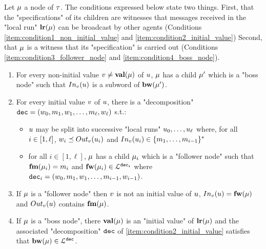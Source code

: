 Let $\mu$ a node of $\tau$. 
The conditions expressed below state two things. First, that the "specifications" of its children are witnesses that messages received in the "local run" $\mathbf{lr}(\mu)$ can be broadcast by other agents (Conditions \ref{item:condition1_non_initial_value} and \ref{item:condition2_initial_value})
Second, that $\mu$ is a witness that its "specification" is carried out (Conditions \ref{item:condition3_follower_node} and \ref{item:condition4_boss_node}).
\begin{enumerate}[{Condition} (i)]
	\item \label{item:condition1_non_initial_value} For every non-initial value $v \ne \mathbf{val}(\mu)$ of $u$, $\mu$ has a child $\mu'$ which is a "boss node" such that $\vinput{\aval}{\localrun}$ is a subword of $\mathbf{bw}(\mu')$.
	
	\item \label{item:condition2_initial_value} For every initial value $v$ of $u$, there is a "decomposition" $\mathtt{dec} = (w_0, m_1, w_1, \ldots, m_{\ell}, w_{\ell})$ s.t.:
	\begin{itemize}
		\item $u$ may be split into successive "local runs" $u_0, \dots, u_{\ell}$ where, for all $i \in [1,\ell]$, $w_i \subword \voutput{\aval}{\localrun_i}$ and $\vinput{\aval}{\localrun_i} \in \set{m_1, \dots, m_{i-1}}^*$
		\item for all $i \in [1,\ell]$, $\mu$ has a child $\mu_i$ which is a "follower node" such that $\mathbf{fm}(\mu_i) = m_i$ and $\mathbf{fw}(\mu_i) \in\mathcal{L}^{\mathtt{\mathtt{dec}_i}}$ where $\mathtt{dec}_i = (w_0, m_1, w_1, \ldots, m_{i-1}, w_{i-1})$.	\end{itemize}
	
	\item \label{item:condition3_follower_node} If $\mu$ is a "follower node" then $v$ is not an initial value of $u$, $\vinput{\aval}{\localrun} = \followlabelword{\node}$ and 
	$\voutput{\aval}{\localrun}$ contains $\mathbf{fm}(\mu)$.

	\item \label{item:condition4_boss_node} If $\mu$ is a "boss node", there $\mathbf{val}(\mu)$ is an "initial value" of $\mathbf{lr}(\mu)$ and the associated "decomposition" $\mathtt{dec}$ of \ref{item:condition2_initial_value} satisfies that $\mathbf{bw}(\mu) \in \mathcal{L}^{\mathtt{\mathtt{dec}}}$.
\end{enumerate}

